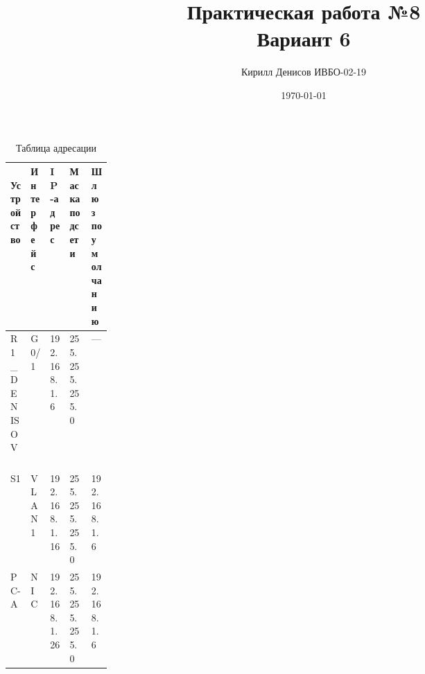 \documentclass[a4paper,14pt]{extarticle}
\author{Кирилл Денисов ИВБО-02-19}
\title{Практическая работа №8\\Вариант 6}
\date{\today}
\newcommand{\pathToCommonFolder}{/home/denilai/Documents/repos/latex/Common}
\newcommand{\router}{R1\_DENISOV~}
\newcommand{\switch}{S1~}
\begin{document}
	\newpage
	\newpage
\maketitle


\begin{table}[htbp]
	\begin{center}
		\caption{Таблица адресации}
		\begin{tabular}{|l|l|l|l|m{0.17\linewidth}|}
			\hline\
			\textbf{Устройство}  & \textbf{Интерфейс} & \textbf{IP-адрес} & \textbf{Маска подсети} & \textbf{Шлюз по умолчанию} \\ \hline
			\router & G0/1   & 192.168.1.6  & 255.255.255.0  &  —          \\\hline
			\switch & VLAN 1 & 192.168.1.16 & 255.255.255.0  & 192.168.1.6 \\\hline
			PC-A    & NIC    & 192.168.1.26  & 255.255.255.0 & 192.168.1.6\\\hline
		\end{tabular}
		\label{tab:adress}
	\end{center}
\end{table}
\end{document}
